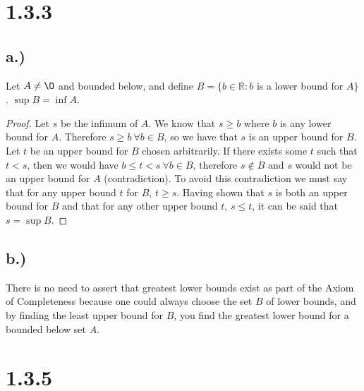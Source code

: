 \documentclass{article}
\begin{document}
\section*{1.3.3}
\subsection*{a.)}
Let $A \neq \O$ and bounded below, and define $B = \{ b \in \mathbb{R} :b$ is a lower bound for $A \}$. $\sup{B} = \inf{A}$.

\begin{proof}
Let $s$ be the infimum of $A$. We know that $s \geqslant b$ where $b$ is any lower bound for $A$. Therefore $s \geqslant b \ \forall b \in B$, so we have that $s$ is an upper bound for $B$. Let $t$ be an upper bound for $B$ chosen arbitrarily. If there exists some $t$ such that $t < s$, then we would have $b \leqslant t < s \ \forall b \in B$, therefore $s \notin B$ and $s$ would not be an upper bound for $A$ (contradiction). To avoid this contradiction we must say that for any upper bound $t$ for $B$, $t \geqslant s$. Having shown that $s$ is both an upper bound for $B$ and that for any other upper bound $t$, $s \leqslant t$, it can be said that $s = \sup{B}$.

\end{proof}

\subsection*{b.)}
There is no need to assert that greatest lower bounds exist as part of the Axiom of Completeness because one could always choose the set $B$ of lower bounds, and by finding the least upper bound for $B$, you find the greatest lower bound for a bounded below set $A$.

\section*{1.3.5}
\end{document}
